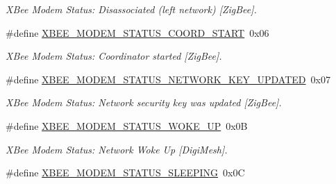 \begin{DoxyCompactItemize}
\begin{DoxyCompactList}\small\item\em X\-Bee Modem Status\-: Disassociated (left network) \mbox{[}Zig\-Bee\mbox{]}. \end{DoxyCompactList}\item 
\hypertarget{group__xbee__device_ga057ed15b292ea3e48a138c6737fb0339}{\#define \hyperlink{group__xbee__device_ga057ed15b292ea3e48a138c6737fb0339}{X\-B\-E\-E\-\_\-\-M\-O\-D\-E\-M\-\_\-\-S\-T\-A\-T\-U\-S\-\_\-\-C\-O\-O\-R\-D\-\_\-\-S\-T\-A\-R\-T}~0x06}\label{group__xbee__device_ga057ed15b292ea3e48a138c6737fb0339}

\begin{DoxyCompactList}\small\item\em X\-Bee Modem Status\-: Coordinator started \mbox{[}Zig\-Bee\mbox{]}. \end{DoxyCompactList}\item 
\hypertarget{group__xbee__device_ga465cfa03dffba6584345938283b1c200}{\#define \hyperlink{group__xbee__device_ga465cfa03dffba6584345938283b1c200}{X\-B\-E\-E\-\_\-\-M\-O\-D\-E\-M\-\_\-\-S\-T\-A\-T\-U\-S\-\_\-\-N\-E\-T\-W\-O\-R\-K\-\_\-\-K\-E\-Y\-\_\-\-U\-P\-D\-A\-T\-E\-D}~0x07}\label{group__xbee__device_ga465cfa03dffba6584345938283b1c200}

\begin{DoxyCompactList}\small\item\em X\-Bee Modem Status\-: Network security key was updated \mbox{[}Zig\-Bee\mbox{]}. \end{DoxyCompactList}\item 
\hypertarget{group__xbee__device_gafdc21028c63554f391dc8f88e9fb82ef}{\#define \hyperlink{group__xbee__device_gafdc21028c63554f391dc8f88e9fb82ef}{X\-B\-E\-E\-\_\-\-M\-O\-D\-E\-M\-\_\-\-S\-T\-A\-T\-U\-S\-\_\-\-W\-O\-K\-E\-\_\-\-U\-P}~0x0\-B}\label{group__xbee__device_gafdc21028c63554f391dc8f88e9fb82ef}

\begin{DoxyCompactList}\small\item\em X\-Bee Modem Status\-: Network Woke Up \mbox{[}Digi\-Mesh\mbox{]}. \end{DoxyCompactList}\item 
\hypertarget{group__xbee__device_ga1a7c823908fa0c74b692665b9a76ac99}{\#define \hyperlink{group__xbee__device_ga1a7c823908fa0c74b692665b9a76ac99}{X\-B\-E\-E\-\_\-\-M\-O\-D\-E\-M\-\_\-\-S\-T\-A\-T\-U\-S\-\_\-\-S\-L\-E\-E\-P\-I\-N\-G}~0x0\-C}\label{group__xbee__device_ga1a7c823908fa0c74b692665b9a76ac99}


\end{DoxyCompactItemize}
